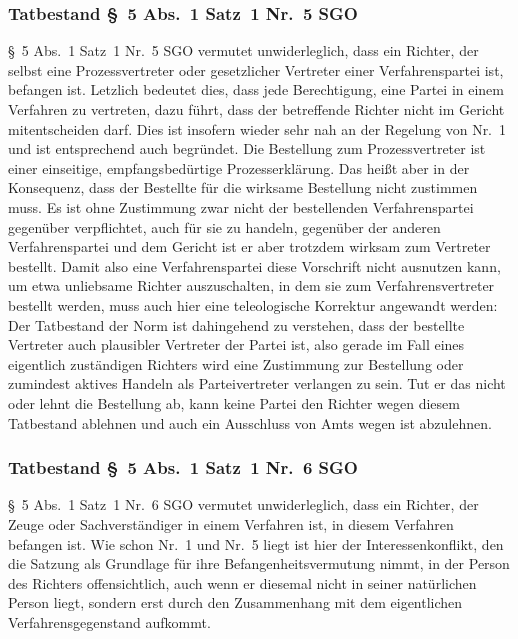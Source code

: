 \subsubsection{Tatbestand \S~5 Abs.~1 Satz~1 Nr.~5 SGO}
\label{Zusammensetzung:Spruchkoerper:Befangenheitsvermutung:Nr5}
\S~5 Abs.~1 Satz~1 Nr.~5 SGO vermutet unwiderleglich, dass ein Richter, der selbst eine Prozessvertreter oder gesetzlicher Vertreter einer Verfahrenspartei ist, befangen ist.
Letzlich bedeutet dies, dass jede Berechtigung, eine Partei in einem Verfahren zu vertreten, dazu führt, dass der betreffende Richter nicht im Gericht mitentscheiden darf.
Dies ist insofern wieder sehr nah an der Regelung von Nr.~1 und ist entsprechend auch begründet.
Die Bestellung zum Prozessvertreter ist einer einseitige, empfangsbedürtige Prozesserklärung.
Das heißt aber in der Konsequenz, dass der Bestellte für die wirksame Bestellung nicht zustimmen muss.
Es ist ohne Zustimmung zwar nicht der bestellenden Verfahrenspartei gegenüber verpflichtet, auch für sie zu handeln, gegenüber der anderen Verfahrenspartei und dem Gericht ist er aber trotzdem wirksam zum Vertreter bestellt.
Damit also eine Verfahrenspartei diese Vorschrift nicht ausnutzen kann, um etwa unliebsame Richter auszuschalten, in dem sie zum Verfahrensvertreter bestellt werden, muss auch hier eine teleologische Korrektur angewandt werden: Der Tatbestand der Norm ist dahingehend zu verstehen, dass der bestellte Vertreter auch plausibler Vertreter der Partei ist, also gerade im Fall eines eigentlich zuständigen Richters wird eine Zustimmung zur Bestellung oder zumindest aktives Handeln als Parteivertreter verlangen zu sein.
Tut er das nicht oder lehnt die Bestellung ab, kann keine Partei den Richter wegen diesem Tatbestand ablehnen und auch ein Ausschluss von Amts wegen ist abzulehnen.

\subsubsection{Tatbestand \S~5 Abs.~1 Satz~1 Nr.~6 SGO}
\label{Zusammensetzung:Spruchkoerper:Befangenheitsvermutung:Nr6}
\S~5 Abs.~1 Satz~1 Nr.~6 SGO vermutet unwiderleglich, dass ein Richter, der  Zeuge oder Sachverständiger in einem Verfahren ist, in diesem Verfahren befangen ist.
Wie schon Nr.~1 und Nr.~5 liegt ist hier der Interessenkonflikt, den die Satzung als Grundlage für ihre Befangenheitsvermutung nimmt, in der Person des Richters offensichtlich, auch wenn er diesemal nicht in seiner natürlichen Person liegt, sondern erst durch den Zusammenhang mit dem eigentlichen Verfahrensgegenstand aufkommt.

